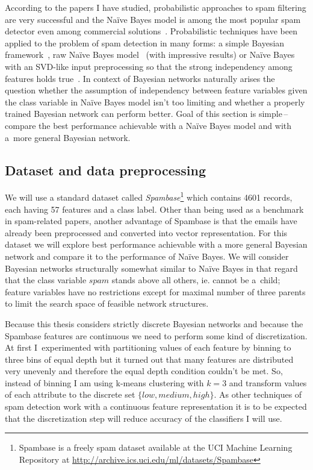\documentclass[english,cover]{fitthesis} %
\newcommand{\term}[1]{\emph{#1}}           %
\begin{document}
According to the papers I have studied, probabilistic approaches to spam filtering are very successful and the Naïve Bayes model is among the most popular spam detector even among commercial solutions~\cite{blanzieri09}. Probabilistic techniques have been applied to the problem of spam detection in many forms: a simple Bayesian framework~\cite{isaac09}, raw Naïve Bayes model~\cite{heckerman98_spam} (with impressive results) or Naïve Bayes with an SVD-like input preprocessing so that the strong independency among features holds true~\cite{renuka11}. In context of Bayesian networks naturally arises the question whether the assumption of independency between feature variables given the class variable in Naïve Bayes model isn't too limiting and whether a properly trained Bayesian network can perform better. Goal of this section is simple\,--\,compare the best performance achievable with a Naïve Bayes model and with a~more general Bayesian network.


\subsection{Dataset and data preprocessing}
We will use a standard dataset called \term{Spambase}\footnote{Spambase is a freely spam dataset available at the UCI Machine Learning Repository at \url{http://archive.ics.uci.edu/ml/datasets/Spambase}} which contains 4601 records, each having 57 features and a class label. Other than being used as a benchmark in spam-related papers, another advantage of Spambase is that the emails have already been preprocessed and converted into vector representation. For this dataset we will explore best performance achievable with a more general Bayesian network and compare it to the performance of Naïve Bayes. We will consider Bayesian networks structurally somewhat similar to Naïve Bayes in that regard that the class variable $spam$ stands above all others, ie. cannot be a~child; feature variables have no restrictions except for maximal number of three parents to limit the search space of feasible network structures.

Because this thesis considers strictly discrete Bayesian networks and because the Spambase features are continuous we need to perform some kind of discretization. At first I~experimented with partitioning values of each feature by binning to three bins of equal depth but it turned out that many features are distributed very unevenly and therefore the equal depth condition couldn't be met. So, instead of binning I am using k-means clustering with $k=3$ and transform values of each attribute to the discrete set $\lbrace low, medium, high \rbrace$. As other techniques of spam detection work with a continuous feature representation it is to be expected that the discretization step will reduce accuracy of the classifiers I will use.
\end{document}
